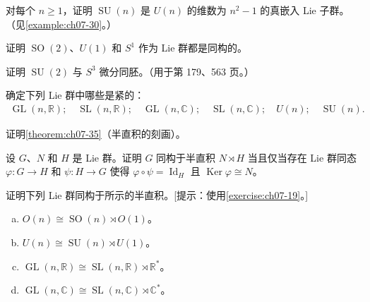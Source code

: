 \documentclass[../../main.tex]{subfiles}
\begin{document}
\begin{exercise}\label{exercise:ch07-14}
对每个 $n\geqslant1$，证明 $\operatorname{SU}(n)$ 是 $U(n)$ 的维数为 $n^2-1$ 的真嵌入 Lie 子群。（见\cref{example:ch07-30}。）
\end{exercise}

\begin{exercise}\label{exercise:ch07-15}
证明 $\operatorname{SO}(2)$、$U(1)$ 和 $S^1$ 作为 Lie 群都是同构的。
\end{exercise}

\begin{exercise}\label{exercise:ch07-16}
证明 $\operatorname{SU}(2)$ 与 $S^3$ 微分同胚。（用于第 179、563 页。）
\end{exercise}

\begin{exercise}\label{exercise:ch07-17}
确定下列 Lie 群中哪些是紧的：
\begin{align*}
\operatorname{GL}(n,\mathbb{R});\quad \operatorname{SL}(n,\mathbb{R});\quad \operatorname{GL}(n,\mathbb{C});\quad \operatorname{SL}(n,\mathbb{C});\quad U(n);\quad \operatorname{SU}(n).
\end{align*}
\end{exercise}

\begin{exercise}\label{exercise:ch07-18}
证明\cref{theorem:ch07-35}（半直积的刻画）。
\end{exercise}

\begin{exercise}\label{exercise:ch07-19}
设 $G$、$N$ 和 $H$ 是 Lie 群。证明 $G$ 同构于半直积 $N\rtimes H$ 当且仅当存在 Lie 群同态 $\varphi\colon G\to H$ 和 $\psi\colon H\to G$ 使得 $\varphi\circ\psi=\operatorname{Id}_H$ 且 $\operatorname{Ker}\varphi\cong N$。
\end{exercise}

\begin{exercise}\label{exercise:ch07-20}
证明下列 Lie 群同构于所示的半直积。[提示：使用\cref{exercise:ch07-19}。]
\begin{enumerate}[(a)]
\item $O(n)\cong\operatorname{SO}(n)\rtimes O(1)$。
\item $U(n)\cong\operatorname{SU}(n)\rtimes U(1)$。
\item $\operatorname{GL}(n,\mathbb{R})\cong\operatorname{SL}(n,\mathbb{R})\rtimes\mathbb{R}^*$。
\item $\operatorname{GL}(n,\mathbb{C})\cong\operatorname{SL}(n,\mathbb{C})\rtimes\mathbb{C}^*$。
\end{enumerate}
\end{exercise}
\end{document}
